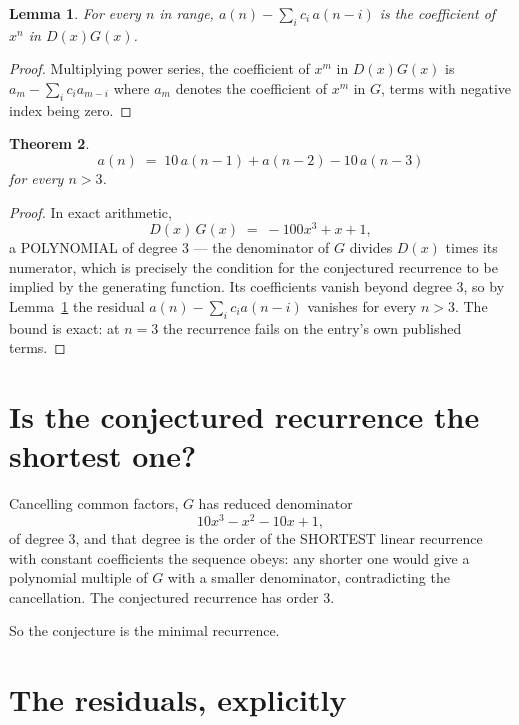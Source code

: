 \documentclass[11pt,a4paper]{article}
\theoremstyle{plain}
\newtheorem{theorem}{Theorem}
\newtheorem{lemma}[theorem]{Lemma}
\theoremstyle{definition}
\begin{document}
\begin{lemma}\label{lem:key}
For every $n$ in range, $a(n)-\sum_i c_i\,a(n-i)$ is the coefficient of $x^{n}$ in
$D(x)G(x)$.
\end{lemma}

\begin{proof}
Multiplying power series, the coefficient of $x^{m}$ in $D(x)G(x)$ is
$a_m-\sum_i c_i a_{m-i}$ where $a_m$ denotes the coefficient of $x^{m}$ in $G$, terms with
negative index being zero.
\end{proof}

\begin{theorem}
\[
a(n)\;=\;10\,a(n-1) + a(n-2) - 10\,a(n-3)
\]
for every $n>3$.
\end{theorem}

\begin{proof}
In exact arithmetic,
\[
D(x)\,G(x)\;=\;- 100 x^{3} + x + 1,
\]
a POLYNOMIAL of degree $3$ --- the denominator of $G$ divides $D(x)$ times its numerator,
which is precisely the condition for the conjectured recurrence to be implied by the
generating function. Its coefficients vanish beyond degree $3$, so by
Lemma~\ref{lem:key} the residual $a(n)-\sum_ic_ia(n-i)$ vanishes for every
$n>3$. The bound is exact: at $n=3$ the recurrence fails on the entry's own published terms.
\end{proof}

\section{Is the conjectured recurrence the shortest one?}

Cancelling common factors, $G$ has reduced denominator
\[
10 x^{3} - x^{2} - 10 x + 1,
\]
of degree $3$, and that degree is the order of the SHORTEST linear recurrence with
constant coefficients the sequence obeys: any shorter one would give a polynomial multiple of
$G$ with a smaller denominator, contradicting the cancellation. The conjectured recurrence has
order $3$.

So the conjecture is the minimal recurrence.

\section{The residuals, explicitly}
\end{document}
